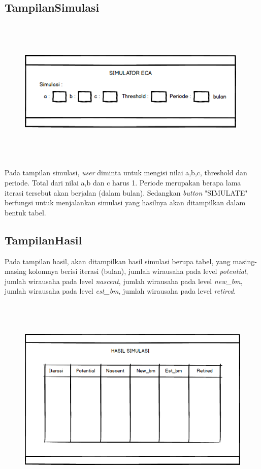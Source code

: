 \subsection{TampilanSimulasi}

\begin{figure} [H]
	\centering  
	\includegraphics[width=11cm, height=7cm]{mockup5} 
	\label{fig:simulasi} 
\end{figure}

Pada tampilan simulasi, \textit{user} diminta untuk mengisi nilai a,b,c, threshold dan periode. Total dari nilai a,b dan c harus 1. Periode merupakan berapa lama iterasi tersebut akan berjalan (dalam bulan). Sedangkan \textit{button} "SIMULATE" berfungsi untuk menjalankan simulasi yang hasilnya akan ditampilkan dalam bentuk tabel.

\subsection{TampilanHasil}

Pada tampilan hasil, akan ditampilkan hasil simulasi berupa tabel, yang masing-masing kolomnya berisi iterasi (bulan), jumlah wirausaha pada level \textit{potential}, jumlah wirausaha pada level \textit{nascent}, jumlah wirausaha pada level \textit{new\_bm}, jumlah wirausaha pada level \textit{est\_bm}, jumlah wirausaha pada level \textit{retired}.
\begin{figure} [H]
	\centering  
	\includegraphics[width=12cm, height=10cm]{mockup6} 
	\label{fig:tampilanHasil} 
\end{figure}

